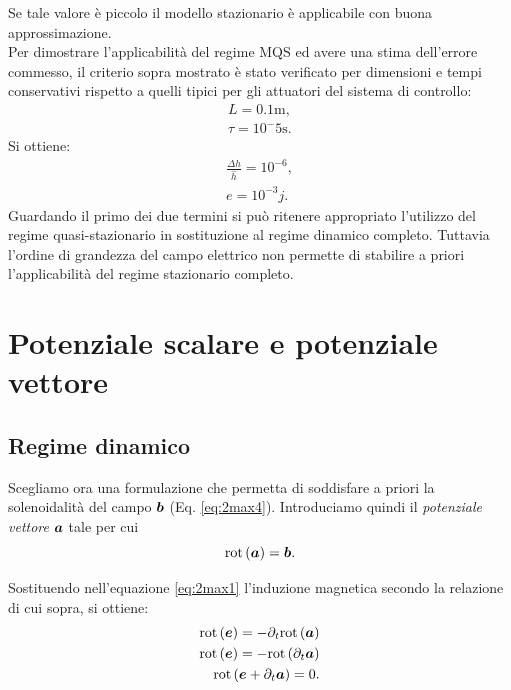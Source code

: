 Se tale valore è piccolo il modello stazionario è applicabile con buona approssimazione.\\

Per dimostrare l'applicabilità del regime MQS ed avere una stima dell'errore commesso, il criterio sopra mostrato è stato verificato per dimensioni e tempi conservativi rispetto a quelli tipici per gli attuatori del sistema di controllo:
\begin{equation}
\nonumber
\begin{array}{l}
L = 0.1 \text{m},\\
\tau = 10^-5 \text{s}.
\end{array}
\end{equation}
Si ottiene:
\begin{equation}
\nonumber
\begin{array}{l}
\frac{\Delta h}{\hat{h}} = 10^{-6},\\
e = 10^{-3}j.
\end{array}
\end{equation}
Guardando il primo dei due termini si può ritenere appropriato l'utilizzo del regime quasi-stazionario in sostituzione al regime dinamico completo. Tuttavia l'ordine di grandezza del campo elettrico non permette di stabilire a priori l'applicabilità del regime stazionario completo.

\section{Potenziale scalare e potenziale vettore}
\label{subsec:1potenziale}
\subsection{Regime dinamico}
Scegliamo ora una formulazione che permetta di soddisfare a priori la solenoidalità del campo $\boldsymbol{b}$ (Eq. \eqref{eq:2max4}). Introduciamo quindi il \textit{potenziale vettore} $\boldsymbol{a}$ tale per cui
\begin{equation}
\label{eq:2potvet}
\text{rot}\left(\boldsymbol{a}\right) = \boldsymbol{b}.
\end{equation}

Sostituendo nell'equazione \eqref{eq:2max1} l'induzione magnetica secondo la relazione di cui sopra, si ottiene:
\begin{align}
\label{eq:2potvet2}
\text{rot}\left(\boldsymbol{e}\right)=-\partial_t \text{rot}\left(\boldsymbol{a}\right)\nonumber\\
\text{rot}\left(\boldsymbol{e}\right)=- \text{rot}\left(\partial_t\boldsymbol{a}\right)\nonumber\\
\text{rot}\left(\boldsymbol{e}+\partial_t\boldsymbol{a}\right)=0.
\end{align}


